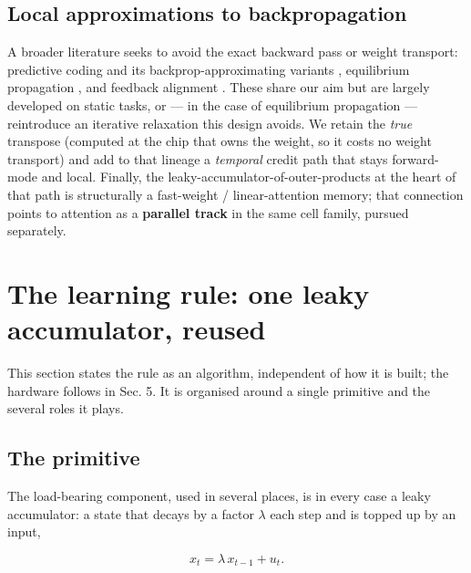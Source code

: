 \documentclass[11pt]{article}
\begin{document}
\hypertarget{local-approximations-to-backpropagation}{%
\subsection{Local approximations to
backpropagation}\label{local-approximations-to-backpropagation}}

A broader literature seeks to avoid the exact backward pass or weight
transport: predictive coding and its backprop-approximating variants
\cite{rao1999predictive, friston2010free, whittington2017approximation, millidge2022predictive, bogacz2017tutorial},
equilibrium propagation \cite{scellier2017equilibrium}, and feedback
alignment \cite{lillicrap2016random, nokland2016direct}. These share
our aim but are largely developed on static tasks, or --- in the case of
equilibrium propagation --- reintroduce an iterative relaxation this
design avoids. We retain the \emph{true} transpose (computed at the chip
that owns the weight, so it costs no weight transport) and add to that
lineage a \emph{temporal} credit path that stays forward-mode and local.
Finally, the leaky-accumulator-of-outer-products at the heart of that
path is structurally a fast-weight / linear-attention memory; that
connection points to attention as a \textbf{parallel track} in the same
cell family, pursued separately.

\hypertarget{sec:rule}{%
\section{The learning rule: one leaky accumulator,
reused}\label{sec:rule}}

This section states the rule as an algorithm, independent of how it is
built; the hardware follows in Sec. 5. It is organised around a single
primitive and the several roles it plays.

\hypertarget{sec:prim}{%
\subsection{The primitive}\label{sec:prim}}

The load-bearing component, used in several places, is in every case a
leaky accumulator: a state that decays by a factor \(\lambda\) each step
and is topped up by an input,

\begin{equation}
x_t = \lambda\, x_{t-1} + u_t .
\label{eq:prim}
\end{equation}
\end{document}
